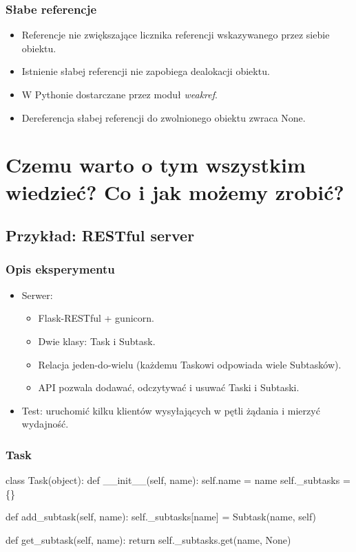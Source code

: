 \documentclass{beamer}
\begin{document}
    \begin{frame}
        \frametitle{Słabe referencje}
        \begin{itemize}
            \item Referencje nie zwiększające licznika referencji wskazywanego przez siebie obiektu.
            \item Istnienie słabej referencji nie zapobiega dealokacji obiektu.
            \item W Pythonie dostarczane przez moduł \textit{weakref}.
            \item Dereferencja słabej referencji do zwolnionego obiektu zwraca None.
        \end{itemize}
    \end{frame}


\section{Czemu warto o tym wszystkim wiedzieć? Co i jak możemy zrobić?}
\frame\sectionpage
\subsection{Przykład: RESTful server}
\frame\subsectionpage
    \begin{frame}
        \frametitle{Opis eksperymentu}
        \begin{itemize}
            \item Serwer:
            \begin{itemize}
                \item Flask-RESTful + gunicorn.
                \item Dwie klasy: Task i Subtask.
                \item Relacja jeden-do-wielu (każdemu Taskowi odpowiada wiele Subtasków).
                \item API pozwala dodawać, odczytywać i usuwać Taski i Subtaski.
            \end{itemize}
            \item Test: uruchomić kilku klientów wysyłających w pętli żądania i mierzyć wydajność.
        \end{itemize}
    \end{frame}

    \begin{frame}[fragile]
        \frametitle{Task}
        \begin{semiverbatim}
class Task(object):
    def __init__(self, name):
        self.name = name
        self._subtasks = \{\}

    def add_subtask(self, name):
        self._subtasks[name] = Subtask(name, self)

    def get_subtask(self, name):
        return self._subtasks.get(name, None)
        \end{semiverbatim}
\end{frame}
\end{document}
